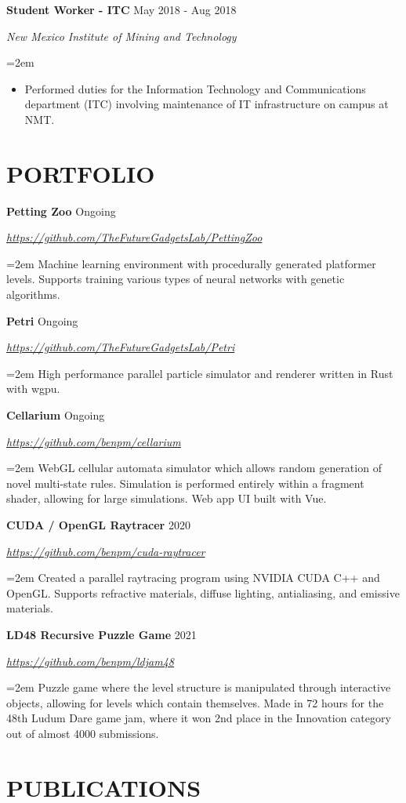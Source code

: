 \documentclass[paper=a4,fontsize=11pt]{scrartcl} %
\newcommand{\sepspace}{\vspace*{1em}}		%
\newcommand{\sym}{\raisebox{1pt}{$\blacktriangleright$}}
\newcommand{\showurl}[1]{\href{#1}{#1}}
\newcommand{\NewPart}[1]{\section*{\sym \mbox{} \MakeUppercase{#1}}}
\newcommand{\EducationEntry}[5]{
		\Large \noindent \textbf{#1} \hfill \\   %
		\normalsize \noindent \textit{#2} \hfill	  %
		\colorbox{yel}{\color{blk}#3} \par  %
		\noindent \textit{#4} \par        %
		\noindent\hangindent=2em\hangafter=0 \small #5 %
		\normalsize \par
		\sepspace}
\newcommand{\WorkEntry}[4]{				  %
		\noindent \textbf{#1} \hfill      %
		\colorbox{yel}{\color{blk}#2} \par  %
		\noindent \textit{#3} \par              %
		\noindent\hangindent=2em\hangafter=0 \small #4 %
		\normalsize \par
		\sepspace}
\begin{document}
\WorkEntry{Student Worker - ITC}
	{May 2018 - Aug 2018}{New Mexico Institute of Mining and Technology}{\noindent
	\begin{itemize}
		\item Performed duties for the Information Technology and Communications department (ITC)
			involving maintenance of IT infrastructure on campus at NMT.
	\end{itemize}
}



\NewPart{Portfolio}{}

\WorkEntry{Petting Zoo}{Ongoing}{\showurl{https://github.com/TheFutureGadgetsLab/PettingZoo}}{
	Machine learning environment with procedurally generated platformer levels.
	Supports training various types of neural networks with genetic algorithms.
}

\WorkEntry{Petri}{Ongoing}{\showurl{https://github.com/TheFutureGadgetsLab/Petri}}{
	High performance parallel particle simulator and renderer written in Rust with wgpu.
}

\WorkEntry{Cellarium}{Ongoing}{\showurl{https://github.com/benpm/cellarium}}{
	WebGL cellular automata simulator which allows random generation of novel multi-state rules.
	Simulation is performed entirely within a fragment shader, allowing for large simulations.
	Web app UI built with Vue.
}

\WorkEntry{CUDA / OpenGL Raytracer}{2020}{\showurl{https://github.com/benpm/cuda-raytracer}}{
	Created a parallel raytracing program using NVIDIA CUDA C++ and OpenGL.
	Supports refractive materials, diffuse lighting, antialiasing, and emissive materials.
}

\WorkEntry{LD48 Recursive Puzzle Game}{2021}{\showurl{https://github.com/benpm/ldjam48}}{
	Puzzle game where the level structure is manipulated through interactive objects,
	allowing for levels which contain themselves.
	Made in 72 hours for the 48th Ludum Dare game jam, where it won 2nd place in the Innovation category
	out of almost 4000 submissions.
}


\NewPart{Publications}{}
\end{document}
